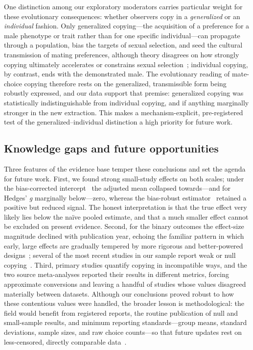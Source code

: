 One distinction among our exploratory moderators carries particular weight for these evolutionary consequences: whether observers copy in a \textit{generalized} or an \textit{individual} fashion. Only generalized copying---the acquisition of a preference for a male phenotype or trait rather than for one specific individual---can propagate through a population, bias the targets of sexual selection, and seed the cultural transmission of mating preferences, although theory disagrees on how strongly copying ultimately accelerates or constrains sexual selection~\cite{varelaRoleMatechoiceCopying2018}; individual copying, by contrast, ends with the demonstrated male. The evolutionary reading of mate-choice copying therefore rests on the generalized, transmissible form being robustly expressed, and our data support that premise: generalized copying was statistically indistinguishable from individual copying, and if anything marginally stronger in the new extraction. This makes a mechanism-explicit, pre-registered test of the generalized--individual distinction a high priority for future work.

\subsection{Knowledge gaps and future opportunities}

Three features of the evidence base temper these conclusions and set the agenda for future work. First, we found strong small-study effects on both scales; under the bias-corrected intercept~\cite{nakagawaMethodsTestingPublication2022} the adjusted mean collapsed towards---and for Hedges' \textit{g} marginally below---zero, whereas the bias-robust estimator~\cite{yangRobustPointVariance2024} retained a positive but reduced signal. The honest interpretation is that the true effect very likely lies below the naïve pooled estimate, and that a much smaller effect cannot be excluded on present evidence. Second, for the binary outcomes the effect-size magnitude declined with publication year, echoing the familiar pattern in which early, large effects are gradually tempered by more rigorous and better-powered designs~\cite{jennionsRelationshipsFadeTime2002, korichevaTemporalInstabilityEvidence2019}; several of the most recent studies in our sample report weak or null copying~\cite{belkinaMateChoiceCopying2021, cirinoRobustMatePreferences2023, pusiakRelativeSexualAttractiveness2020, nobelNoEvidenceMate2023}. Third, primary studies quantify copying in incompatible ways, and the two source meta-analyses reported their results in different metrics, forcing approximate conversions and leaving a handful of studies whose values disagreed materially between datasets. Although our conclusions proved robust to how these contentious values were handled, the broader lesson is methodological: the field would benefit from registered reports, the routine publication of null and small-sample results, and minimum reporting standards---group means, standard deviations, sample sizes, and raw choice counts---so that future updates rest on less-censored, directly comparable data~\cite{daviesMetaanalysisFactorsInfluencing2020}.

